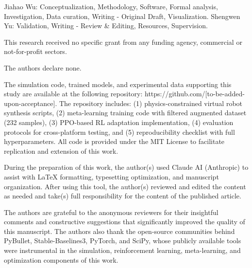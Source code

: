 \documentclass[DTMColor]{ROB-New}
\begin{document}
\begin{con}


Jiahao Wu: Conceptualization, Methodology, Software, Formal analysis, Investigation, Data curation, Writing - Original Draft, Visualization. Shengwen Yu: Validation, Writing - Review \& Editing, Resources, Supervision.


This research received no specific grant from any funding agency, commercial or not-for-profit sectors.


The authors declare none.


The simulation code, trained models, and experimental data supporting this study are available at the following repository: https://github.com/[to-be-added-upon-acceptance]. The repository includes: (1) physics-constrained virtual robot synthesis scripts, (2) meta-learning training code with filtered augmented dataset (232 samples), (3) PPO-based RL adaptation implementation, (4) evaluation protocols for cross-platform testing, and (5) reproducibility checklist with full hyperparameters. All code is provided under the MIT License to facilitate replication and extension of this work.


During the preparation of this work, the author(s) used Claude AI (Anthropic) to assist with LaTeX formatting, typesetting optimization, and manuscript organization. After using this tool, the author(s) reviewed and edited the content as needed and take(s) full responsibility for the content of the published article.

\vspace{-6pt}

The authors are grateful to the anonymous reviewers for their insightful comments and constructive suggestions that significantly improved the quality of this manuscript. The authors also thank the open-source communities behind PyBullet, Stable-Baselines3, PyTorch, and SciPy, whose publicly available tools were instrumental in the simulation, reinforcement learning, meta-learning, and optimization components of this work.

\end{con}
\end{document}
